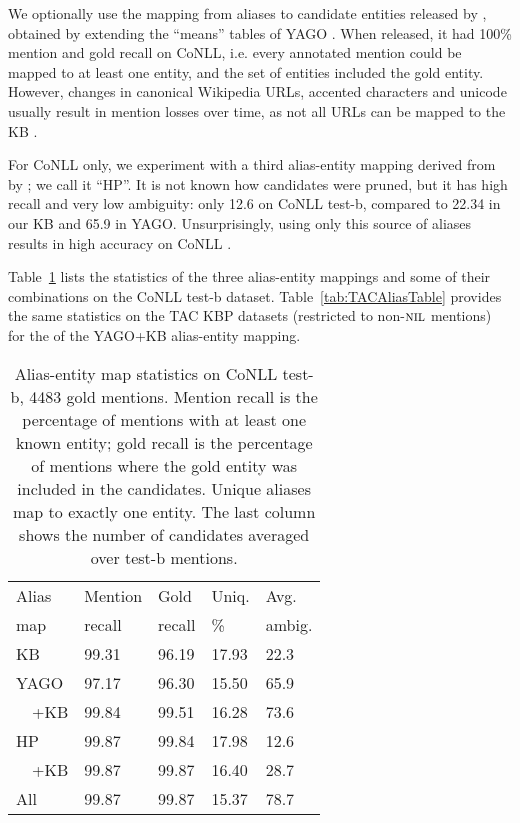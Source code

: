 We optionally use the mapping from aliases to candidate entities released
by , obtained by extending the
``means'' tables of YAGO \cite{hoffart2013yago2}.  When released,
it had 100\% mention and gold recall on CoNLL, i.e. every annotated mention
could be mapped to at least one entity, and the set of entities included the gold entity. 
However, changes in canonical Wikipedia URLs, accented characters and
unicode usually result in mention losses over time, as not all URLs can be mapped to the
KB \cite[Sec.~4]{hasibi2016reproducibility}.

For CoNLL only, we experiment with a third alias-entity mapping derived 
from  by ; we call it ``HP''.  
It is not known how candidates were pruned, but it has high recall
and very low ambiguity: only 12.6 on CoNLL test-b, compared to 22.34 in our KB
and 65.9 in YAGO.  Unsurprisingly, using only this source of aliases results in
high accuracy on CoNLL \cite{Pershina2015,YamadaS0T16}.

Table~\ref{tab:AliasTable} lists the statistics of the three alias-entity mappings
and some of their combinations on the CoNLL test-b dataset. 
Table~\ref{tab:TACAliasTable} provides the same statistics on the TAC KBP datasets 
(restricted to non-$\mbox{\textsc{nil}}$ mentions) for the of the YAGO+KB alias-entity mapping.



\begin{table}
  \centering
  \begin{tabular}{l|l|l|l|l}
    Alias  & Mention &   Gold  & Uniq.  & Avg.  \\
    map    & recall  & recall  & \%     & ambig. \\
    \hline
    KB & 99.31 & 96.19 & 17.93 & 22.3 \\
    \hline
    YAGO   & 97.17 & 96.30 & 15.50 & 65.9 \\
    ~~+KB  & 99.84 & 99.51 & 16.28 & 73.6 \\
    \hline
    HP     & 99.87 & 99.84 & 17.98 & 12.6 \\
    ~~+KB  & 99.87 & 99.87 & 16.40 & 28.7 \\
    \hline
    All    & 99.87 & 99.87 & 15.37 & 78.7
  \end{tabular}
  \caption{Alias-entity map statistics on CoNLL test-b,
    4483 gold mentions.  Mention recall is the percentage of
    mentions with at least one known entity; gold recall is the percentage
    of mentions where the gold entity was included in the candidates.
    Unique aliases map to exactly one entity.  The last column
    shows the number of candidates averaged over test-b mentions.}
  \label{tab:AliasTable}
\end{table}

